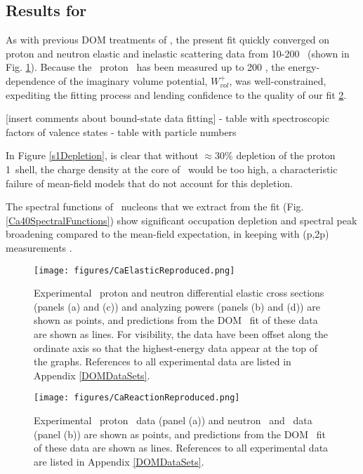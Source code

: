 \subsection{Results for \caForty}
As with previous DOM treatments of \caForty \cite{MahzoonPhDThesis}, the present fit
quickly converged on proton and neutron elastic and inelastic scattering data from 10-200
\mega\electronvolt\ (shown in Fig. \ref{CaElasticReproduced}). Because the \caForty\ proton \rxn\ 
has been
measured up to 200 \mega\electronvolt, the energy-dependence of the imaginary volume potential, 
$W_{vol}^{+}$, was well-constrained, expediting the fitting process
and lending confidence to the quality of our fit \ref{CaReactionReproduced}. 

[insert comments about bound-state data fitting]
- table with spectroscopic factors of valence states
- table with particle numbers

In Figure \ref{s1Depletion}, is clear that without $\approx$30\%
depletion of the proton 1\sOne\ shell, the charge density at the core of
\caForty\ would be too high,
a characteristic failure of mean-field models that do not account for this depletion. 

The spectral functions of \caForty\ nucleons that 
we extract from the fit (Fig. \ref{Ca40SpectralFunctions}) show significant occupation depletion and 
spectral peak broadening compared 
to the mean-field expectation, in keeping with (p,2p) measurements \cite{LiverpoolCa40}.

\begin{figure}[tb]
    \centering
    \texttt{[image: figures/CaElasticReproduced.png]}
    \caption[Nucleon differential cross sections of \caForty: DOM predictions and experimental data]
    {
        Experimental \caForty\ proton and neutron differential elastic cross sections
        (panels (a) and (c)) and analyzing powers (panels (b) and (d)) are shown as points, and 
        predictions from the DOM \caForty\ fit of these data are shown as lines. For visibility, the 
        data have been offset along the ordinate axis so that the highest-energy data
        appear at the top of the graphs. References to all experimental data are listed
        in Appendix \ref{DOMDataSets}.
    }
    \label{CaElasticReproduced}
\end{figure}

\begin{figure}[tb]
    \centering
    \texttt{[image: figures/CaReactionReproduced.png]}
    \caption[Nucleon \rxn\ of \caForty: DOM predictions and experimental data]
    {
        Experimental \caForty\ proton \rxn\ data (panel (a)) and neutron \tot\ and \rxn\ data (panel
        (b)) are shown as points, and 
        predictions from the DOM \caForty\ fit of these data are shown as lines.
        References to all experimental data are listed in Appendix \ref{DOMDataSets}.
    }
    \label{CaReactionReproduced}
\end{figure}

